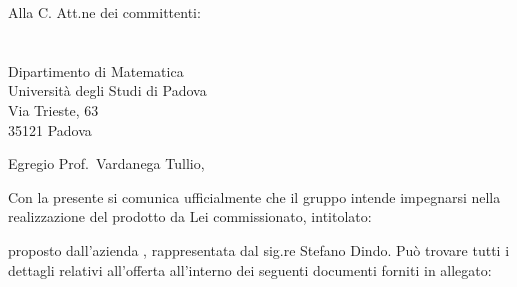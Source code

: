 \documentclass[a4paper,12pt]{letteracdp}
\date{2017-01-11}
\begin{document}
  \begin{letter}{
    Alla C. Att.ne dei committenti: \\
    \COMMITTENTE \\
    \CARDIN      \\
    Dipartimento di Matematica \\
		Università degli Studi di Padova \\
		Via Trieste, 63 \\
		35121 Padova}
		
    \opening{Egregio Prof.~Vardanega Tullio,}
    Con la presente si comunica ufficialmente che il gruppo intende impegnarsi
    nella realizzazione del prodotto da Lei commissionato, intitolato:
    \begin{center}
      \CAPITOLATO
    \end{center}
    proposto dall'azienda \PROPONENTE{}, rappresentata dal sig.re Stefano Dindo.
    Può trovare tutti i dettagli relativi all'offerta all'interno dei seguenti
    documenti forniti in allegato:


\end{letter}
\end{document}
